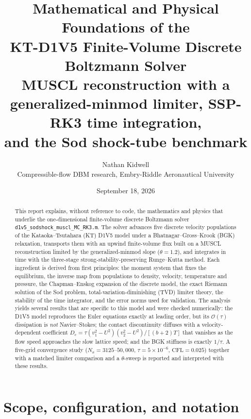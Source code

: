 \documentclass[11pt]{article}
\title{\textbf{Mathematical and Physical Foundations of the\\ KT-D1V5 Finite-Volume Discrete Boltzmann Solver}\\[4pt]
\large MUSCL reconstruction with a generalized-minmod limiter, SSP-RK3 time integration,\\ and the Sod shock-tube benchmark}
\author{Nathan Kidwell\\ \small Compressible-flow DBM research, Embry-Riddle Aeronautical University}
\date{September 18, 2026}
\newcommand{\file}[1]{\nolinkurl{#1}}
\theoremstyle{remark}
\newcommand{\ord}{\mathcal{O}}
\begin{document}
\maketitle

\begin{abstract}
\noindent
This report explains, without reference to code, the mathematics and physics that
underlie the one-dimensional finite-volume discrete Boltzmann solver
\file{d1v5_sodshock_muscl_MC_RK3.m}.
The solver advances five discrete velocity populations of the Kataoka--Tsutahara
(KT) D1V5 model under a Bhatnagar--Gross--Krook (BGK) relaxation, transports them
with an upwind finite-volume flux built on a MUSCL reconstruction limited by the
generalized-minmod slope ($\theta = 1.2$), and integrates in time with the
three-stage strong-stability-preserving Runge--Kutta method.
Each ingredient is derived from first principles: the moment system that fixes the
equilibrium, the inverse map from populations to density, velocity, temperature
and pressure, the Chapman--Enskog expansion of the discrete model, the exact
Riemann solution of the Sod problem, total-variation-diminishing (TVD) limiter
theory, the stability of the time integrator, and the error norms used for
validation.
The analysis yields several results that are specific to this model and were
checked numerically: the D1V5 model reproduces the Euler equations exactly at
leading order, but its $\ord(\tau)$ dissipation is \emph{not} Navier--Stokes;
the contact discontinuity diffuses with a velocity-dependent coefficient
$D_c = \tau (v_1^2-U^2)(v_2^2-U^2)/[(b+2)T]$ that vanishes as the flow speed
approaches the slow lattice speed; and the BGK stiffness is exactly $1/\tau$.
A five-grid convergence study ($N_x = 3125$--$50{,}000$, $\tau = 5\times10^{-6}$,
$\mathrm{CFL}=0.025$) together with a matched limiter comparison and a
$\theta$-sweep is reported and interpreted with these results.
\end{abstract}

\tableofcontents
\clearpage

\section{Scope, configuration, and notation}
\label{sec:scope}
\end{document}

